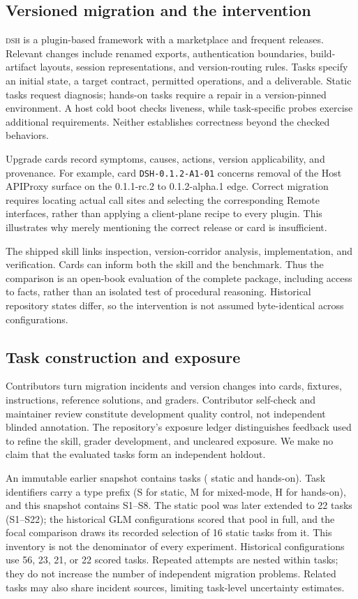 \documentclass[11pt]{article}
\newcommand{\framework}{\textsc{dsh}}
\begin{document}
\subsection{Versioned migration and the intervention}\label{sec:intervention}
\framework{} is a plugin-based framework with a marketplace and frequent releases. Relevant changes include renamed exports, authentication boundaries, build-artifact layouts, session representations, and version-routing rules. Tasks specify an initial state, a target contract, permitted operations, and a deliverable. Static tasks request diagnosis; hands-on tasks require a repair in a version-pinned environment. A host cold boot checks liveness, while task-specific probes exercise additional requirements. Neither establishes correctness beyond the checked behaviors.

Upgrade cards record symptoms, causes, actions, version applicability, and provenance. For example, card \texttt{DSH-0.1.2-A1-01} concerns removal of the Host APIProxy surface on the 0.1.1-rc.2 to 0.1.2-alpha.1 edge. Correct migration requires locating actual call sites and selecting the corresponding Remote interfaces, rather than applying a client-plane recipe to every plugin. This illustrates why merely mentioning the correct release or card is insufficient.

The shipped skill links inspection, version-corridor analysis, implementation, and verification. Cards can inform both the skill and the benchmark. Thus the comparison is an open-book evaluation of the complete package, including access to facts, rather than an isolated test of procedural reasoning. Historical repository states differ, so the intervention is not assumed byte-identical across configurations.

\subsection{Task construction and exposure}\label{sec:exposure}
Contributors turn migration incidents and version changes into cards, fixtures, instructions, reference solutions, and graders. Contributor self-check and maintainer review constitute development quality control, not independent blinded annotation. The repository's exposure ledger distinguishes feedback used to refine the skill, grader development, and uncleared exposure. We make no claim that the evaluated tasks form an independent holdout.

An immutable earlier snapshot contains \BenchmarkTaskCount{} tasks (\BenchmarkStaticCount{} static and \BenchmarkHandsOnCount{} hands-on). Task identifiers carry a type prefix (S for static, M for mixed-mode, H for hands-on), and this snapshot contains S1--S8. The static pool was later extended to 22 tasks (S1--S22); the historical GLM configurations scored that pool in full, and the focal comparison draws its recorded selection of 16 static tasks from it. This inventory is not the denominator of every experiment. Historical configurations use 56, 23, 21, or 22 scored tasks. Repeated attempts are nested within tasks; they do not increase the number of independent migration problems. Related tasks may also share incident sources, limiting task-level uncertainty estimates.
\end{document}
